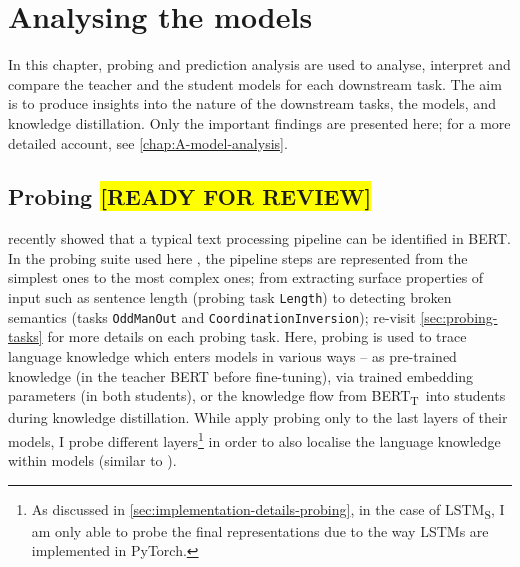 \documentclass[bsc,frontabs,singlespacing,parskip,deptreport]{infthesis}
\def\reviewready{\colorbox{yellow}{[READY FOR REVIEW]}}
\def\BERTT{BERT\textsubscript{T}}
\def\LSTMS{LSTM\textsubscript{S}}
\begin{document}
\chapter{Analysing the models}{
  In this chapter, probing and prediction analysis are used to analyse, interpret and compare the teacher and the student models for each downstream task. 
  The aim is to produce insights into the nature of the downstream tasks, the models, and knowledge distillation.
  Only the important findings are presented here; for a more detailed account, see \autoref{chap:A-model-analysis}.

  \section{Probing \reviewready}{
    \citet{Tenney_2019b} recently showed that a typical text processing pipeline can be identified in BERT.    
    In the probing suite used here \citep{Conneau_2018}, the pipeline steps are represented from the simplest ones to the most complex ones; from extracting surface properties of input such as sentence length (probing task \verb|Length|) to detecting broken semantics (tasks \verb|OddManOut| and \verb|CoordinationInversion|); re-visit \autoref{sec:probing-tasks} for more details on each probing task.
    Here, probing is used to trace language knowledge which enters models in various ways -- as pre-trained knowledge (in the teacher BERT before fine-tuning), via trained embedding parameters (in both students), or the knowledge flow from \BERTT~into students during knowledge distillation.
    While \citeauthor{Conneau_2018} apply probing only to the last layers of their models, I probe different layers\footnote{As discussed in \autoref{sec:implementation-details-probing}, in the case of \LSTMS, I am only able to probe the final representations due to the way LSTMs are implemented in PyTorch.} in order to also localise the language knowledge within models (similar to \citeauthor{Tenney_2019b}).
    
}}
\end{document}
